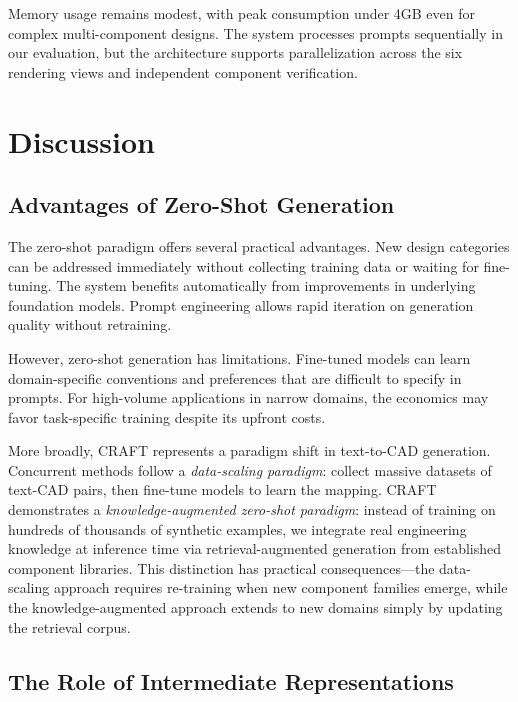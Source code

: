 \documentclass[5p,twocolumn,10pt,times]{elsarticle}
\begin{document}
Memory usage remains modest, with peak consumption under 4GB even for complex multi-component designs. The system processes prompts sequentially in our evaluation, but the architecture supports parallelization across the six rendering views and independent component verification.



\section{Discussion}
\label{sec:discussion}
\subsection{Advantages of Zero-Shot Generation}

The zero-shot paradigm offers several practical advantages. New design categories can be addressed immediately without collecting training data or waiting for fine-tuning. The system benefits automatically from improvements in underlying foundation models. Prompt engineering allows rapid iteration on generation quality without retraining.

However, zero-shot generation has limitations. Fine-tuned models can learn domain-specific conventions and preferences that are difficult to specify in prompts. For high-volume applications in narrow domains, the economics may favor task-specific training despite its upfront costs.

More broadly, CRAFT represents a paradigm shift in text-to-CAD generation. Concurrent methods follow a \emph{data-scaling paradigm}: collect massive datasets of text-CAD pairs, then fine-tune models to learn the mapping. CRAFT demonstrates a \emph{knowledge-augmented zero-shot paradigm}: instead of training on hundreds of thousands of synthetic examples, we integrate real engineering knowledge at inference time via retrieval-augmented generation from established component libraries. This distinction has practical consequences---the data-scaling approach requires re-training when new component families emerge, while the knowledge-augmented approach extends to new domains simply by updating the retrieval corpus.

\subsection{The Role of Intermediate Representations}
\end{document}
